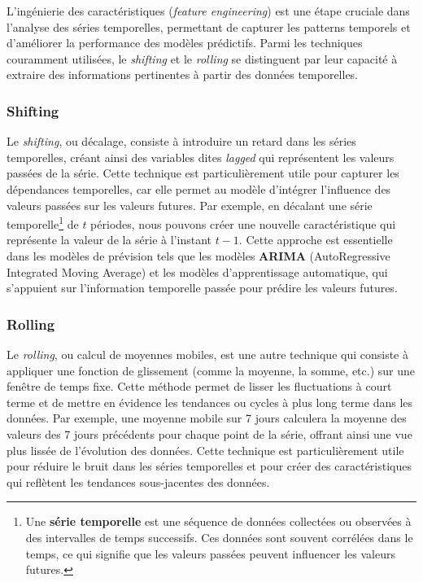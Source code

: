L'ingénierie des caractéristiques (\textit{feature engineering}) est une étape cruciale dans l'analyse des séries temporelles, permettant de capturer les patterns temporels et d'améliorer la performance des modèles prédictifs. Parmi les techniques couramment utilisées, le \textit{shifting} et le \textit{rolling} se distinguent par leur capacité à extraire des informations pertinentes à partir des données temporelles.

\subsubsection*{Shifting}

Le \textit{shifting}, ou décalage, consiste à introduire un retard dans les séries temporelles, créant ainsi des variables dites \textit{lagged} qui représentent les valeurs passées de la série. Cette technique est particulièrement utile pour capturer les dépendances temporelles, car elle permet au modèle d'intégrer l'influence des valeurs passées sur les valeurs futures. Par exemple, en décalant une série temporelle\footnote{Une \textbf{série temporelle} est une séquence de données collectées ou observées à des intervalles de temps successifs. Ces données sont souvent corrélées dans le temps, ce qui signifie que les valeurs passées peuvent influencer les valeurs futures.} de $t$ périodes, nous pouvons créer une nouvelle caractéristique qui représente la valeur de la série à l'instant $t-1$. Cette approche est essentielle dans les modèles de prévision tels que les modèles \textbf{ARIMA} (AutoRegressive Integrated Moving Average) et les modèles d'apprentissage automatique, qui s'appuient sur l'information temporelle passée pour prédire les valeurs futures.

\subsubsection*{Rolling}

Le \textit{rolling}, ou calcul de moyennes mobiles, est une autre technique qui consiste à appliquer une fonction de glissement (comme la moyenne, la somme, etc.) sur une fenêtre de temps fixe. Cette méthode permet de lisser les fluctuations à court terme et de mettre en évidence les tendances ou cycles à plus long terme dans les données. Par exemple, une moyenne mobile sur 7 jours calculera la moyenne des valeurs des 7 jours précédents pour chaque point de la série, offrant ainsi une vue plus lissée de l'évolution des données. Cette technique est particulièrement utile pour réduire le bruit dans les séries temporelles et pour créer des caractéristiques qui reflètent les tendances sous-jacentes des données.


